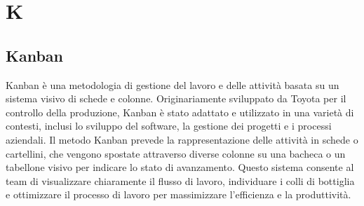 \section{K}

\vspace{2em}
\subsection*{Kanban}
Kanban è una metodologia di gestione del lavoro e delle attività basata su un sistema visivo di schede e colonne. Originariamente sviluppato da Toyota per il controllo della produzione, Kanban è stato adattato e utilizzato in una varietà di contesti, inclusi lo sviluppo del software, la gestione dei progetti e i processi aziendali. Il metodo Kanban prevede la rappresentazione delle attività in schede o cartellini, che vengono spostate attraverso diverse colonne su una bacheca o un tabellone visivo per indicare lo stato di avanzamento. Questo sistema consente al team di visualizzare chiaramente il flusso di lavoro, individuare i colli di bottiglia e ottimizzare il processo di lavoro per massimizzare l'efficienza e la produttività.


